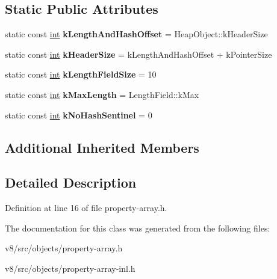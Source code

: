 \subsection*{Static Public Attributes}
\begin{DoxyCompactItemize}
\item 
\mbox{\label{classv8_1_1internal_1_1PropertyArray_a7d27c5bbe99e21318e710fd8738504b2}} 
static const \mbox{\hyperlink{classint}{int}} {\bfseries k\+Length\+And\+Hash\+Offset} = Heap\+Object\+::k\+Header\+Size
\item 
\mbox{\label{classv8_1_1internal_1_1PropertyArray_a14ed4e70a653defdc081ee1f023265ba}} 
static const \mbox{\hyperlink{classint}{int}} {\bfseries k\+Header\+Size} = k\+Length\+And\+Hash\+Offset + k\+Pointer\+Size
\item 
\mbox{\label{classv8_1_1internal_1_1PropertyArray_a63ff4fcc4e77a43b61cb1473ea689463}} 
static const \mbox{\hyperlink{classint}{int}} {\bfseries k\+Length\+Field\+Size} = 10
\item 
\mbox{\label{classv8_1_1internal_1_1PropertyArray_a579c57b2a0a71c4be1492231266a1474}} 
static const \mbox{\hyperlink{classint}{int}} {\bfseries k\+Max\+Length} = Length\+Field\+::k\+Max
\item 
\mbox{\label{classv8_1_1internal_1_1PropertyArray_aca6022daa11a32e80ae3a6ddc2659d4f}} 
static const \mbox{\hyperlink{classint}{int}} {\bfseries k\+No\+Hash\+Sentinel} = 0
\end{DoxyCompactItemize}
\subsection*{Additional Inherited Members}


\subsection{Detailed Description}


Definition at line 16 of file property-\/array.\+h.



The documentation for this class was generated from the following files\+:\begin{DoxyCompactItemize}
\item 
v8/src/objects/property-\/array.\+h\item 
v8/src/objects/property-\/array-\/inl.\+h\end{DoxyCompactItemize}
